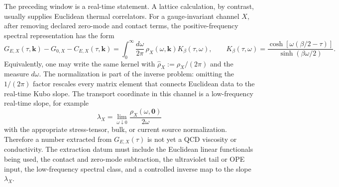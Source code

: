 \begin{controlledapproximation}
\label{ca:qcd-euclidean-retarded-transport-extraction}
The preceding window is a real-time statement.  A lattice calculation, by
contrast, usually supplies Euclidean thermal correlators.  For a
gauge-invariant channel \(X\), after removing declared zero-mode and contact
terms, the positive-frequency spectral representation has the form
\begin{equation}
  G_{E,X}(\tau,\mathbf k)-G_{0,X}-C_{E,X}(\tau,\mathbf k)
  =
  \int_0^\infty \frac{d\omega}{2\pi}\,
  \rho_X(\omega,\mathbf k)K_\beta(\tau,\omega),
  \qquad
  K_\beta(\tau,\omega)
  =
  \frac{\cosh[\omega(\beta/2-\tau)]}{\sinh(\beta\omega/2)} .
  \label{eq:qcd-euclidean-spectral-kernel}
\end{equation}
Equivalently, one may write the same kernel with
\(\widehat\rho_X:=\rho_X/(2\pi)\) and the measure \(d\omega\).  The
normalization is part of the inverse problem: omitting the \(1/(2\pi)\) factor
rescales every matrix element that connects Euclidean data to the real-time
Kubo slope.
The transport coordinate in this channel is a low-frequency real-time slope,
for example
\[
  \lambda_X
  =
  \lim_{\omega\downarrow0}
  \frac{\rho_X(\omega,\mathbf0)}{2\omega}
\]
with the appropriate stress-tensor, bulk, or current source normalization.
Therefore a number extracted from \(G_{E,X}(\tau)\) is not yet a QCD
viscosity or conductivity.  The extraction datum must include the Euclidean
linear functionals being used, the contact and zero-mode subtraction, the
ultraviolet tail or OPE input, the low-frequency spectral class, and a
controlled inverse map to the slope \(\lambda_X\).


\end{controlledapproximation}
